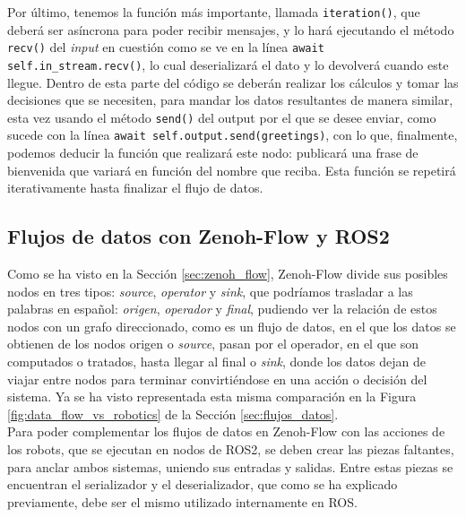 Por último, tenemos la función más importante, llamada \verb|iteration()|, que
deberá ser asíncrona para poder recibir mensajes, y lo hará ejecutando el método
\verb|recv()| del \textit{input} en cuestión como se ve en la línea
\verb|await self.in_stream.recv()|, lo cual deserializará el dato y lo devolverá
cuando este llegue.
Dentro de esta parte del código se deberán realizar los cálculos y tomar las
decisiones que se necesiten, para mandar los datos resultantes de manera
similar, esta vez usando el método \verb|send()| del output por el que se desee
enviar, como sucede con la línea \verb|await self.output.send(greetings)|, con
lo que, finalmente, podemos deducir la función que realizará este nodo:
publicará una frase de bienvenida que variará en función del nombre que reciba.
Esta función se repetirá iterativamente hasta finalizar el flujo de datos.
\\



\subsection{Flujos de datos con Zenoh-Flow y ROS2}
\label{sec:zf_ros}

Como se ha visto en la Sección \ref{sec:zenoh_flow}, Zenoh-Flow divide sus
posibles nodos en tres tipos: \textit{source}, \textit{operator} y
\textit{sink}, que podríamos trasladar a las palabras en español:
\textit{origen}, \textit{operador} y \textit{final}, pudiendo ver la relación de
estos nodos con un grafo direccionado, como es un flujo de datos, en el que los
datos se obtienen de los nodos origen o \textit{source}, pasan por el operador,
en el que son computados o tratados, hasta llegar al final o \textit{sink},
donde los datos dejan de viajar entre nodos para terminar convirtiéndose en una
acción o decisión del sistema.
Ya se ha visto representada esta misma comparación en la Figura
\ref{fig:data_flow_vs_robotics} de la Sección \ref{sec:flujos_datos}.
\\

Para poder complementar los flujos de datos en Zenoh-Flow con las acciones de
los robots, que se ejecutan en nodos de ROS2, se deben crear las piezas
faltantes, para anclar ambos sistemas, uniendo sus entradas y salidas.
Entre estas piezas se encuentran el serializador y el deserializador, que como
se ha explicado previamente, debe ser el mismo utilizado internamente en ROS.
\\

